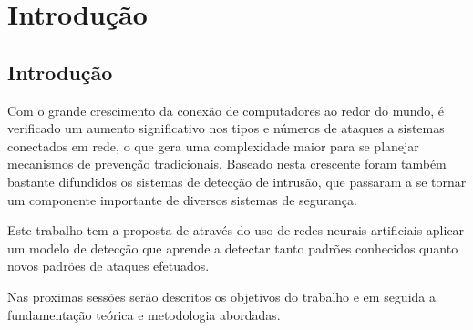 \part{Introdução}
\chapter[Introdução]{Introdução}

Com o grande crescimento da conexão de computadores ao redor do mundo, é verificado um aumento significativo nos tipos e números de ataques a sistemas conectados em rede, o que gera uma complexidade maior para se planejar mecanismos de prevenção tradicionais. Baseado nesta crescente foram também bastante difundidos os sistemas de detecção de intrusão, que passaram a se tornar um componente importante de diversos sistemas de segurança.

Este trabalho tem a proposta de através do uso de redes neurais artificiais aplicar um modelo de detecção que aprende a detectar tanto padrões conhecidos quanto novos padrões de  ataques efetuados.

Nas proximas sessões serão descritos os objetivos do trabalho e em seguida a fundamentação teórica e metodologia abordadas.